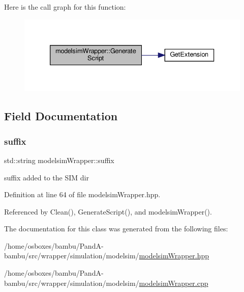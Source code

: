 Here is the call graph for this function\+:
\nopagebreak
\begin{figure}[H]
\begin{center}
\leavevmode
\includegraphics[width=333pt]{d1/d7f/classmodelsimWrapper_a5eaa08f8c0b15b12a72046e04f290b86_cgraph}
\end{center}
\end{figure}


\subsection{Field Documentation}
\mbox{\label{classmodelsimWrapper_a1e6782025a8c2dea2fc3dc42943e1755}} 
\subsubsection{\texorpdfstring{suffix}{suffix}}
{\footnotesize\ttfamily std\+::string modelsim\+Wrapper\+::suffix\hspace{0.3cm}{\ttfamily [private]}}



suffix added to the S\+IM dir 



Definition at line 64 of file modelsim\+Wrapper.\+hpp.



Referenced by Clean(), Generate\+Script(), and modelsim\+Wrapper().



The documentation for this class was generated from the following files\+:\begin{DoxyCompactItemize}
\item 
/home/osboxes/bambu/\+Pand\+A-\/bambu/src/wrapper/simulation/modelsim/\hyperlink{modelsimWrapper_8hpp}{modelsim\+Wrapper.\+hpp}\item 
/home/osboxes/bambu/\+Pand\+A-\/bambu/src/wrapper/simulation/modelsim/\hyperlink{modelsimWrapper_8cpp}{modelsim\+Wrapper.\+cpp}\end{DoxyCompactItemize}
